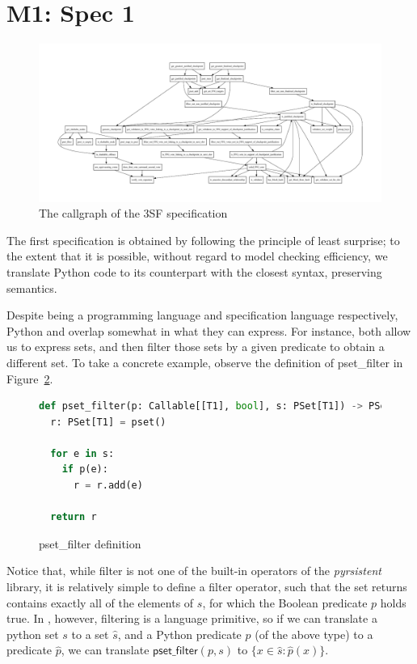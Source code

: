 
\section{M1: Spec 1}

\begin{figure}
    \centering
    \includegraphics[width=\textwidth,angle=-90]{ffg-callgraph.pdf}
    \caption{The callgraph of the 3SF specification}
    \label{fig:your_label}
\end{figure}

The first specification is obtained by following the principle of least surprise; to the extent that it is possible, without regard to model checking efficiency, we translate Python code to its \tlap{} counterpart with the closest syntax, preserving semantics.

Despite being a programming language and specification language respectively, Python and \tlap{} overlap somewhat in what they can express. 
For instance, both allow us to express sets, and then filter those sets by a given predicate to obtain a different set.
To take a concrete example, observe the definition of \textsf{pset\_filter} in Figure~\ref{py_filter}.

\begin{figure}
  \begin{lstlisting}[language=Python,style=mystyle]
def pset_filter(p: Callable[[T1], bool], s: PSet[T1]) -> PSet[T1]:
  r: PSet[T1] = pset()
 
  for e in s:
    if p(e):
      r = r.add(e)
  
  return r
  \end{lstlisting}
\caption{\textsf{pset\_filter} definition \label{py_filter}}
\end{figure}

Notice that, while filter is not one of the built-in operators of the \emph{pyrsistent} library, it is relatively simple to define a filter operator, such that the set returns contains exactly all of the elements of $s$, for which the Boolean predicate $p$ holds true.
In \tlap{}, however, filtering is a language primitive, so if we can translate a python set $s$ to a \tlap{} set $\hat{s}$, and a Python predicate $p$ (of the above type) to a \tlap{} predicate $\hat{p}$, we can translate $\mathsf{pset\_filter}(p, s)$ to $\{ x \in \hat{s}\colon \hat{p}(x) \}$.

